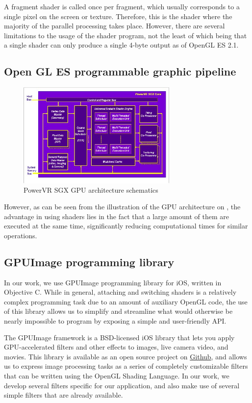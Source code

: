 A fragment shader is called once per fragment, which usually corresponds to a single pixel on the screen or texture. Therefore, this is the shader where the majority of the parallel processing takes place. However, there are several limitations to the usage of the shader program, not the least of which being that a single shader can only produce a single 4-byte output  as of OpenGL ES 2.1. 
\subsection{Open GL ES programmable graphic pipeline}
\begin{figure}[t]
		\centering
		\includegraphics[width=0.7\textwidth]{GPUScheme}
		\caption{PowerVR SGX GPU architecture schematics}
		\label{gpu}
	\end{figure}
However, as can be seen from the illustration of the GPU architecture on  , the advantage in using shaders lies in the fact that a large amount of them are executed at the same time, significantly reducing computational times for similar operations. 
\subsection{GPUImage programming library}
In our work, we use GPUImage programming library for iOS, written in Objective C. While in general, attaching and switching shaders is a relatively complex programming task due to an amount of auxiliary OpenGL code, the use of this library allows us to simplify and  streamline what would otherwise be nearly impossible to program by exposing a simple and user-friendly API. 

 The GPUImage framework is a BSD-licensed iOS library that lets you apply GPU-accelerated filters and other effects to images, live camera video, and movies. This library is available as an open source project on \href{https://github.com/BradLarson/GPUImage}{Github}, and allows us to express image processing tasks as a series of completely customizable filters that can be written using the OpenGL Shading Language. In our work, we develop several filters specific for our application, and also make use of several simple filters that are already available.

